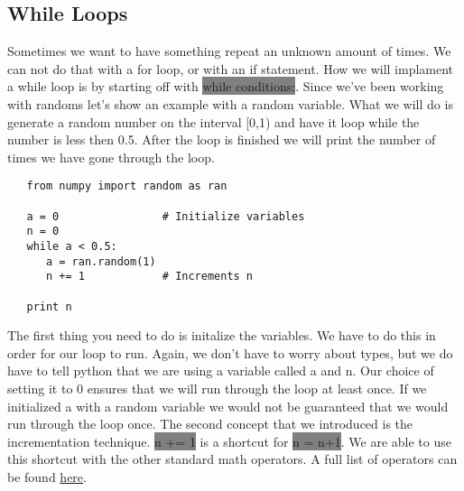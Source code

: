 \documentclass[11pt]{article}   %
\newcommand{\gray}[1]{\colorbox{gray}{#1}}
\begin{document}
\subsection*{While Loops}
Sometimes we want to have something repeat an unknown amount of times.  We can not do that with a for loop, or with an if 
statement.  How we will implament a while loop is by starting off with \gray{while conditions:}.  Since we've been working 
with randoms let's show an example with a random variable.  What we will do is generate a random number on the interval
[0,1) and have it loop while the number is less then 0.5.  After the loop is finished we will print the number of times 
we have gone through the loop.
\begin{tcolorbox}
   \begin{lstlisting}
   from numpy import random as ran

   a = 0                # Initialize variables
   n = 0
   while a < 0.5:
      a = ran.random(1)
      n += 1            # Increments n

   print n
   \end{lstlisting}
\end{tcolorbox}
The first thing you need to do is initalize the variables.  We have to do this in order for our loop to run.  Again,
we don't have to worry about types, but we do have to tell python that we are using a variable called a and n.
Our choice of setting it to 0 ensures that we will run through the loop at least once.  If we initialized a with
a random variable we would not be guaranteed that we would run through the loop once.  The second concept that we 
introduced is the incrementation technique.  \gray{n += 1} is a shortcut for \gray{n = n+1}.  We are able to use this
shortcut with the other standard math operators.  A full list of operators can be found \href{http://www.tutorialspoint.com/python/python_basic_operators.htm}{here}.
\end{document}
